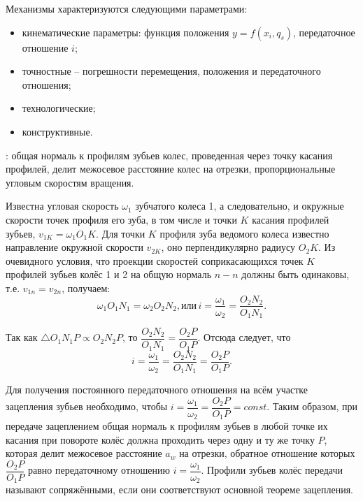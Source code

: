 \documentclass{tufte-book}
\begin{document}
Механизмы характеризуются следующими параметрами:
\begin{itemize}
	\item кинематические параметры: функция положения $ y = f(x_i, q_s) $, передаточное отношение $ i $;
	\item точностные -- погрешности перемещения, положения и передаточного отношения;
	\item технологические;
	\item конструктивные.
\end{itemize}

: общая нормаль к профилям зубьев колес, проведенная через точку касания профилей, делит межосевое расстояние колес на отрезки, пропорциональные угловым скоростям вращения.

Известна угловая скорость $ \omega_1 $ зубчатого колеса 1, а следовательно, и окружные скорости точек профиля его зуба, в том числе и точки $ K $ касания профилей зубьев, $ v_{1K} = \omega_1 O_1 K $. Для точки $ K $ профиля зуба ведомого колеса известно направление окружной скорости $ v_{2K} $, оно перпендикулярно радиусу $ O_2 K $. Из очевидного условия, что проекции скоростей соприкасающихся точек $ K $ профилей зубьев колёс 1 и 2 на общую нормаль $ n-n $ должны быть одинаковы, т.е. $ v_{1n} = v_{2n}$, получаем:
\begin{equation*}
\omega_1 O_1 N_1 = \omega_2 O_2 N_2, \text{или}\, i=\dfrac{\omega_1}{\omega_2} = \dfrac{O_2 N_2}{O_1 N_1}.
\end{equation*}

Так как $ \triangle O_1 N_1 P \propto O_2 N_2 P $, то $ \dfrac{O_2 N_2}{O_1 N_1} = \dfrac{O_2 P}{O_1 P}$. Отсюда следует, что
\begin{equation*}
i=\dfrac{\omega_1}{\omega_2} = \dfrac{O_2 N_2 }{O_1 N_1} = \dfrac{O_2 P}{O_1 P}.
\end{equation*}

Для получения постоянного передаточного отношения на всём участке зацепления зубьев необходимо, чтобы $ i=\dfrac{\omega_1}{\omega_2} = \dfrac{O_2 P}{O_1 P} = const $. Таким образом, при передаче зацеплением общая нормаль к профилям зубьев в любой точке их касания при повороте колёс должна проходить через одну и ту же точку $ P $, которая делит межосевое расстояние $ a_w $ на отрезки, обратное отношение которых $ \dfrac{O_2 P}{O_1 P} $ равно передаточному отношению $ i=\dfrac{\omega_1}{\omega_2} $. Профили зубьев колёс передачи называют сопряжёнными, если они соответствуют основной теореме зацепления.
\end{document}
